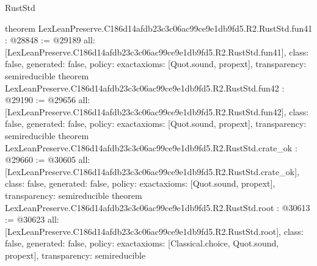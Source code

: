 \begin{lexlean}{RustStd}
\begin{coremodule}
{}
theorem LexLeanPreserve.C186d14afdb23c3c06ac99ce9e1db9fd5.R2.RustStd.fun41 : @28848 := @29189 {
  all: [LexLeanPreserve.C186d14afdb23c3c06ac99ce9e1db9fd5.R2.RustStd.fun41],
  class: false,
  generated: false,
  policy: exact{axioms: [Quot.sound, propext]},
  transparency: semireducible
}
theorem LexLeanPreserve.C186d14afdb23c3c06ac99ce9e1db9fd5.R2.RustStd.fun42 : @29190 := @29656 {
  all: [LexLeanPreserve.C186d14afdb23c3c06ac99ce9e1db9fd5.R2.RustStd.fun42],
  class: false,
  generated: false,
  policy: exact{axioms: [Quot.sound, propext]},
  transparency: semireducible
}
theorem LexLeanPreserve.C186d14afdb23c3c06ac99ce9e1db9fd5.R2.RustStd.crate_ok : @29660 := @30605 {
  all: [LexLeanPreserve.C186d14afdb23c3c06ac99ce9e1db9fd5.R2.RustStd.crate_ok],
  class: false,
  generated: false,
  policy: exact{axioms: [Quot.sound, propext]},
  transparency: semireducible
}
theorem LexLeanPreserve.C186d14afdb23c3c06ac99ce9e1db9fd5.R2.RustStd.root : @30613 := @30623 {
  all: [LexLeanPreserve.C186d14afdb23c3c06ac99ce9e1db9fd5.R2.RustStd.root],
  class: false,
  generated: false,
  policy: exact{axioms: [Classical.choice, Quot.sound, propext]},
  transparency: semireducible
}


\end{coremodule}
\end{lexlean}
